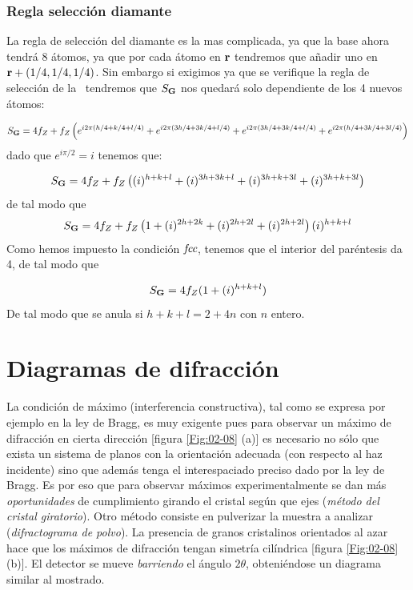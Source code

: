 \subsubsection{Regla selección diamante}

La regla de selección del diamante es la mas complicada, ya que la base ahora tendrá 8 átomos, ya que por cada átomo en $\mathbf{r}$ tendremos que añadir uno en $\mathbf{r}+(1/4,1/4,1/4)$. Sin embargo si exigimos ya que se verifique la regla de selección de la \fcc \ tendremos que $S_{\mathbf{G}}$ nos quedará solo dependiente de los 4 nuevos átomos:


\begin{equation*}
	S_{\mathbf{G}} = 4f_Z +  f_Z  \left( e^{i2\pi(h/4+k/4+l/4)}+e^{i2\pi(3h/4+3k/4+l/4)}+e^{i2\pi(3h/4+3k/4+l/4)}+e^{i2\pi(h/4+3k/4+3l/4)} \right)
\end{equation*}
dado que $e^{i\pi/2}=i$ tenemos que:

\begin{equation*}
	S_{\mathbf{G}} = 4 f_Z + f_Z \left( (i)^{h+k+l}+(i)^{3h+3k+l}+(i)^{3h+k+3l}+(i)^{3h+k+3l} \right)
\end{equation*}
de tal modo que
\begin{equation*}
	S_{\mathbf{G}} = 4 f_Z  + f_Z \left( 1+(i)^{2h+2k}+(i)^{2h+2l}+(i)^{2h+2l} \right)(i)^{h+k+l}
\end{equation*}
Como hemos impuesto la condición $\textit{fcc}$, tenemos que el interior del paréntesis da 4, de tal modo que

\begin{equation*}
	S_{\mathbf{G}} = 4 f_Z (1+(i)^{h+k+l})
\end{equation*}
De tal modo que se anula si $h+k+l=2+4n$ con $n$ entero. 



\section{Diagramas de difracción}

La condición de máximo (interferencia constructiva), tal como se expresa por ejemplo en la ley de Bragg, es muy exigente pues para observar un máximo de difracción en cierta dirección [figura \ref{Fig:02-08} (a)] es necesario no sólo que exista un sistema de planos con la orientación adecuada (con respecto al haz incidente) sino que además tenga el interespaciado preciso dado por la ley de Bragg. Es por eso que para observar máximos experimentalmente se dan más \textit{oportunidades} de cumplimiento girando el cristal según que ejes (\textit{método del cristal giratorio}). Otro método consiste en pulverizar la muestra a analizar (\textit{difractograma de polvo}). La presencia de granos cristalinos orientados al azar hace que los máximos de difracción tengan simetría cilíndrica [figura \ref{Fig:02-08} (b)]. El detector se mueve \textit{barriendo} el ángulo $2\theta$, obteniéndose un diagrama similar al mostrado. 

